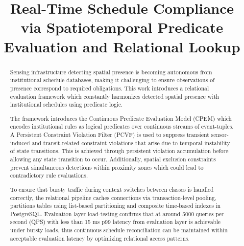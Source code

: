\documentclass[conference]{IEEEtran}
\begin{document}
\title{Real-Time Schedule Compliance via Spatiotemporal Predicate Evaluation and Relational Lookup}

\author{
}

\maketitle

\begin{abstract}
Sensing infrastructure detecting spatial presence is becoming autonomous from institutional schedule databases, making it challenging to ensure observations of presence correspond to required obligations. This work introduces a relational evaluation framework which constantly harmonizes detected spatial presence with institutional schedules using predicate logic.

The framework introduces the Continuous Predicate Evaluation Model (CPEM) which encodes institutional rules as logical predicates over continuous streams of event-tuples. A Persistent Constraint Violation Filter (PCVF) is used to suppress transient sensor-induced and transit-related constraint violations that arise due to temporal instability of state transitions. This is achieved through persistent violation accumulation before allowing any state transition to occur. Additionally, spatial exclusion constraints prevent simultaneous detections within proximity zones which could lead to contradictory rule evaluations.

To ensure that bursty traffic during context switches between classes is handled correctly, the relational pipeline caches connections via transaction-level pooling, partitions tables using list-based partitioning and composite time-based indexes in PostgreSQL. Evaluation layer load-testing confirms that at around 5000 queries per second (QPS) with less than 15 ms p99 latency from evaluation layer is achievable under bursty loads, thus continuous schedule reconciliation can be maintained within acceptable evaluation latency by optimizing relational access patterns.
\end{abstract}
\end{document}
